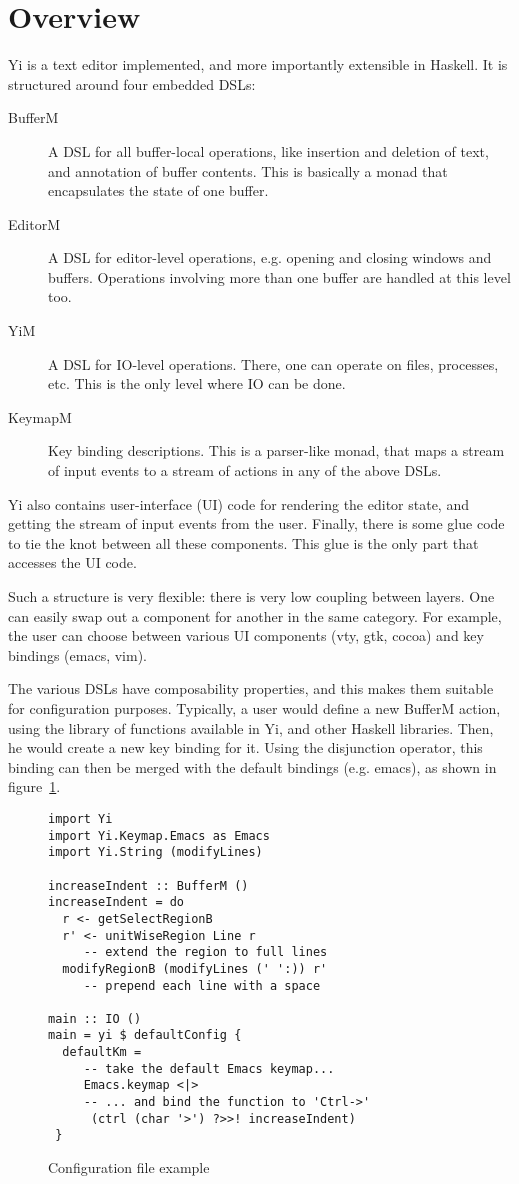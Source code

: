 \documentclass[9pt,indentedstyle,preprint]{sigplanconf}
\begin{document}
\section{Overview}

Yi is a text editor implemented, and more importantly extensible in
Haskell. It is structured around four embedded DSLs:
\begin{description}
\item[BufferM] A DSL for all buffer-local operations, like insertion
  and deletion of text, and annotation of buffer contents. This is
  basically a monad that encapsulates the state of one buffer.
\item[EditorM] A DSL for editor-level operations, e.g. opening and closing
  windows and buffers. Operations involving more than one buffer are
  handled at this level too.
\item[YiM] A DSL for IO-level operations. There, one can operate on files,
  processes, etc.  This is the only level where IO can be done.
\item[KeymapM] Key binding descriptions. This is a parser-like monad,
  that maps a stream of input events to a stream of actions in any of
  the above DSLs.
\end{description}
Yi also contains user-interface (UI) code for rendering the editor
state, and getting the stream of input events from the user.  Finally,
there is some glue code to tie the knot between all these
components. This glue is the only part that accesses the UI code.

Such a structure is very flexible: there is very low coupling between
layers. One can easily swap out a component for another in the same
category. For example, the user can choose between various UI
components (vty, gtk, cocoa) and key bindings (emacs, vim).

The various DSLs have composability properties, and this makes them
suitable for configuration purposes. Typically, a user would
define a new BufferM action, using the library of functions available
in Yi, and other Haskell libraries. Then, he would create a new
key binding for it. Using the disjunction operator, this binding can
then be merged with the default bindings (e.g. emacs), as shown 
in figure~\ref{fig:example}.

\begin{figure}
\begin{verbatim}
import Yi
import Yi.Keymap.Emacs as Emacs
import Yi.String (modifyLines)

increaseIndent :: BufferM ()
increaseIndent = do
  r <- getSelectRegionB 
  r' <- unitWiseRegion Line r 
     -- extend the region to full lines
  modifyRegionB (modifyLines (' ':)) r'
     -- prepend each line with a space
                                     
main :: IO ()
main = yi $ defaultConfig {
  defaultKm = 
     -- take the default Emacs keymap...
     Emacs.keymap <|> 
     -- ... and bind the function to 'Ctrl->'
      (ctrl (char '>') ?>>! increaseIndent)
 }
\end{verbatim}
\caption{Configuration file example}
\label{fig:example}
\end{figure}
\end{document}
